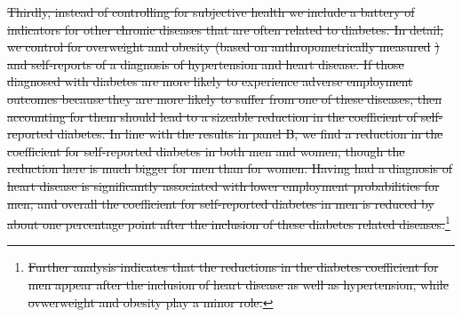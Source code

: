 \documentclass[12pt,english]{article}
\providecommand{\DIFdeltex}[1]{{\protect\color{red}\sout{#1}}}                      %
\providecommand{\DIFdel}[1]{\texorpdfstring{\DIFdeltex{#1}}{}} %
\begin{document}
\DIFdel{Thirdly, instead of controlling for subjective health we include a battery of indicators for other chronic diseases that are often related to diabetes. In detail, we control for overweight and obesity (based on anthropometrically measured }%
\DIFdel{) and self-reports of a diagnosis of hypertension and heart disease. If those diagnosed with diabetes are more likely to experience adverse employment outcomes because they are more likely to suffer from one of these diseases, then accounting for them should lead to a sizeable reduction in the coefficient of self-reported diabetes. In line with the results in panel B, we find a reduction in the coefficient for self-reported diabetes in both men and women, though the reduction here is much bigger for men than for women. Having had a diagnosis of heart disease is significantly associated with lower employment probabilities for men, and overall the coefficient for self-reported diabetes in men is reduced by about one percentage point after the inclusion of these diabetes related diseases.}\footnote{\DIFdel{Further analysis indicates that the reductions in the diabetes coefficient for men appear after the inclusion of heart disease as well as hypertension, while ovwerweight and obesity play a minor role.}}
\addtocounter{footnote}{-1}%
\end{document}
